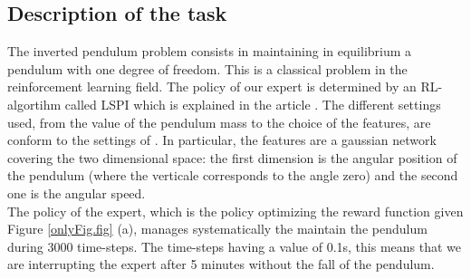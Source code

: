\documentclass{article}
\begin{document}
\subsection{Description of the task}
The inverted pendulum problem consists in maintaining in equilibrium a pendulum with one degree of freedom. This is a classical problem in the reinforcement learning field.
The policy of our expert is determined by an RL-algortihm called LSPI which is explained in the article \cite{lagoudakis2003least}. The different settings used, from the value of the pendulum mass
to the choice of the features, are conform to the settings of \cite{lagoudakis2003least}. In particular, the features are a gaussian network covering the two dimensional space: the first dimension
is the angular position of the pendulum (where the verticale corresponds to the angle zero) and the second one is the angular speed.\\   
The policy of the expert, which is the policy optimizing the reward function given Figure \ref{onlyFig.fig} (a), manages systematically the maintain the pendulum during 3000 time-steps.
The time-steps having a value of 0.1s, this means that we are interrupting the expert after 5 minutes without the fall of the pendulum.\\
\end{document}
